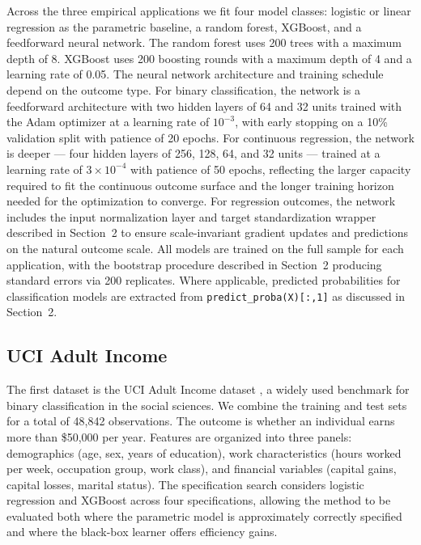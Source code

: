 \documentclass[12pt]{article}
\begin{document}
	Across the three empirical applications we fit four model classes: logistic or linear regression as the parametric baseline, a random forest, XGBoost, and a feedforward neural network. The random forest uses 200 trees with a maximum depth of 8. XGBoost uses 200 boosting rounds with a maximum depth of 4 and a learning rate of 0.05. The neural network architecture and training schedule depend on the outcome type. For binary classification, the network is a feedforward architecture with two hidden layers of 64 and 32 units trained with the Adam optimizer at a learning rate of $10^{-3}$, with early stopping on a 10\% validation split with patience of 20 epochs. For continuous regression, the network is deeper --- four hidden layers of 256, 128, 64, and 32 units --- trained at a learning rate of $3 \times 10^{-4}$ with patience of 50 epochs, reflecting the larger capacity required to fit the continuous outcome surface and the longer training horizon needed for the optimization to converge. For regression outcomes, the network includes the input normalization layer and target standardization wrapper described in Section~2 to ensure scale-invariant gradient updates and predictions on the natural outcome scale. All models are trained on the full sample for each application, with the bootstrap procedure described in Section~2 producing standard errors via 200 replicates. Where applicable, predicted probabilities for classification models are extracted from \texttt{predict\_proba(X)[:,1]} as discussed in Section~2.
	
	\subsection{UCI Adult Income}
	
	The first dataset is the UCI Adult Income dataset \citep{UCI, kohavi1996}, a widely used benchmark for binary classification in the social sciences. We combine the training and test sets for a total of 48,842 observations. The outcome is whether an individual earns more than \$50,000 per year. Features are organized into three panels: demographics (age, sex, years of education), work characteristics (hours worked per week, occupation group, work class), and financial variables (capital gains, capital losses, marital status). The specification search considers logistic regression and XGBoost across four specifications, allowing the method to be evaluated both where the parametric model is approximately correctly specified and where the black-box learner offers efficiency gains.
	
\end{document}
